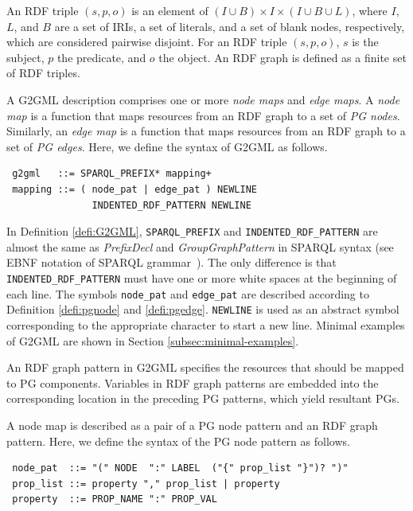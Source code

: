 \documentclass[runningheads]{llncs}
\begin{document}
\begin{prel}
An RDF triple $(s, p, o)$ is an element of $(I \cup B) \times I \times (I \cup B \cup L)$, where $I$, $L$, and $B$ are a set of IRIs, a set of literals, and a set of blank nodes, respectively, which are considered pairwise disjoint. For an RDF triple $(s, p, o)$, $s$ is the subject, $p$ the predicate, and $o$ the object. An RDF graph is defined as a finite set of RDF triples.
\end{prel}

\par
A G2GML description comprises one or more \textit{node maps} and \textit{edge maps}.
A \textit{node map} is a function that maps resources from an RDF graph to a set of \textit{PG nodes}. 
Similarly, an \textit{edge map} is a function that maps resources from an RDF graph to a set of \textit{PG edges}.
Here, we define the syntax of G2GML as follows. 

\begin{defi}
\label{defi:G2GML}
\leavevmode
\begin{verbatim}
 g2gml   ::= SPARQL_PREFIX* mapping+
 mapping ::= ( node_pat | edge_pat ) NEWLINE
               INDENTED_RDF_PATTERN NEWLINE
\end{verbatim}
\end{defi}
In Definition \ref{defi:G2GML}, \texttt{SPARQL\_PREFIX}
 and \texttt{INDENTED\_RDF\_PATTERN} are almost the same as \textit{PrefixDecl} and \textit{GroupGraphPattern} in SPARQL syntax (see EBNF notation of SPARQL grammar~\cite{sparql}).
The only difference is that \texttt{INDENTED\_RDF\_PATTERN} must have one or more white spaces at the beginning of each line.
The symbols \texttt{node\_pat} and \texttt{edge\_pat} are described according to Definition \ref{defi:pgnode} and \ref{defi:pgedge}. \texttt{NEWLINE} is used as an abstract symbol corresponding to the appropriate character to start a new line. Minimal examples of G2GML are shown in Section \ref{subsec:minimal-examples}.

An RDF graph pattern in G2GML specifies the resources that should be mapped to PG components. Variables in RDF graph patterns are embedded into the corresponding location in the preceding PG patterns, which yield resultant PGs. 

A node map is described as a pair of a PG node pattern and an RDF graph pattern. Here, we define the syntax of the PG node pattern as follows. 
\begin{defi}
\label{defi:pgnode}
\leavevmode
\begin{verbatim}
 node_pat  ::= "(" NODE  ":" LABEL  ("{" prop_list "}")? ")"
 prop_list ::= property "," prop_list | property
 property  ::= PROP_NAME ":" PROP_VAL
\end{verbatim}
\end{defi}
\end{document}
